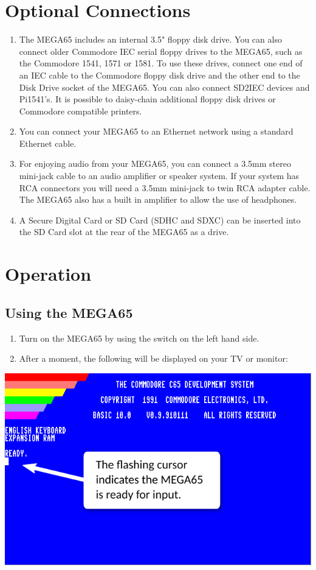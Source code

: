 \section{Optional Connections}

\begin{enumerate}
	\item The MEGA65 includes an internal 3.5" floppy disk drive. You can also connect older Commodore{\textregistered} IEC serial floppy drives to the MEGA65, such as the Commodore{\textregistered} 1541, 1571 or 1581. To use these drives, connect one end of an IEC cable to the Commodore{\textregistered} floppy disk drive and the other end to the Disk Drive socket of the MEGA65. You can also connect SD2IEC devices and Pi1541's. It is possible to daisy-chain additional floppy disk drives or Commodore{\textregistered} compatible printers.
	\item You can connect your MEGA65 to an Ethernet network using a standard Ethernet cable.
	\item For enjoying audio from your MEGA65, you can connect a 3.5mm stereo mini-jack cable to an audio amplifier or speaker system. If your system has RCA connectors you will need a 3.5mm mini-jack to twin RCA adapter cable. The MEGA65 also has a built in amplifier to allow the use of headphones.
	\item A Secure Digital Card or SD Card (SDHC and SDXC) can be inserted into the SD Card slot at the rear of the MEGA65 as a drive.
\end{enumerate}


\section{Operation}

\subsection{Using the MEGA65}

\begin{enumerate}
	\item Turn on the MEGA65 by using the switch on the left hand side.
	\item After a moment, the following will be displayed on your TV or monitor:
\end{enumerate}

\includegraphics[width=\linewidth]{images/introduction-screen/switched-on.png}

